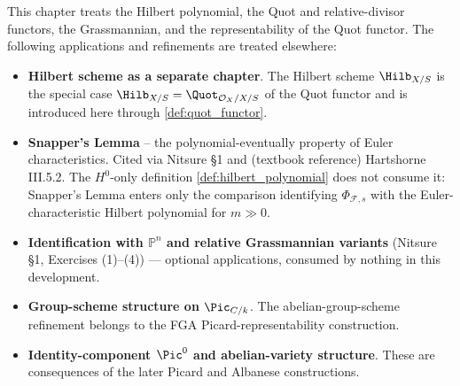 This chapter treats the Hilbert polynomial, the Quot and relative-divisor
functors, the Grassmannian, and the representability of the Quot functor.
The following applications and refinements are treated elsewhere:
\begin{itemize}
  \item \textbf{Hilbert scheme as a separate chapter}. The Hilbert scheme
    \(\Hilb_{X/S}\) is the special case
    \(\Hilb_{X/S} = \Quot_{\mathcal{O}_X/X/S}\) of the Quot functor and is
    introduced here through \cref{def:quot_functor}.
  \item \textbf{Snapper's Lemma} -- the polynomial-eventually property of
    Euler characteristics. Cited via Nitsure \S 1 and (textbook reference)
    Hartshorne III.5.2. The \(H^0\)-only definition
    \cref{def:hilbert_polynomial} does not consume it: Snapper's Lemma enters
    only the comparison identifying
    \(\Phi_{\mathcal{F},s}\) with the Euler-characteristic Hilbert polynomial
    for \(m \gg 0\).
  \item \textbf{Identification with \(\mathbb{P}^n\) and relative
    Grassmannian variants} (Nitsure \S 1, Exercises (1)--(4)) --- optional
    applications, consumed by nothing in this development.
  \item \textbf{Group-scheme structure on \(\Pic_{C/k}\)}. The
    abelian-group-scheme refinement belongs to the FGA
    Picard-representability construction.
  \item \textbf{Identity-component \(\Pic^0\) and abelian-variety
    structure}. These are consequences of the later Picard and Albanese
    constructions.
\end{itemize}
